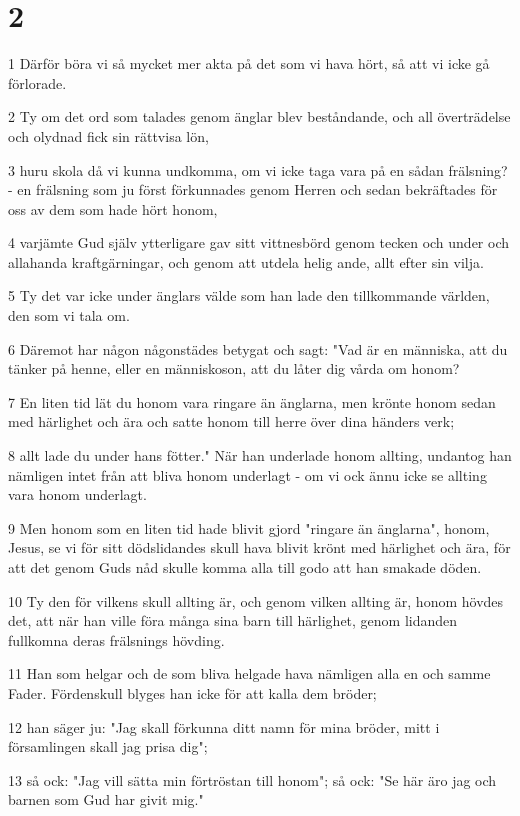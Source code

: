 \chapter{2}

\par 1 Därför böra vi så mycket mer akta på det som vi hava hört, så att vi icke gå förlorade.
\par 2 Ty om det ord som talades genom änglar blev beståndande, och all överträdelse och olydnad fick sin rättvisa lön,
\par 3 huru skola då vi kunna undkomma, om vi icke taga vara på en sådan frälsning? - en frälsning som ju först förkunnades genom Herren och sedan bekräftades för oss av dem som hade hört honom,
\par 4 varjämte Gud själv ytterligare gav sitt vittnesbörd genom tecken och under och allahanda kraftgärningar, och genom att utdela helig ande, allt efter sin vilja.
\par 5 Ty det var icke under änglars välde som han lade den tillkommande världen, den som vi tala om.
\par 6 Däremot har någon någonstädes betygat och sagt: "Vad är en människa, att du tänker på henne, eller en människoson, att du låter dig vårda om honom?
\par 7 En liten tid lät du honom vara ringare än änglarna, men krönte honom sedan med härlighet och ära och satte honom till herre över dina händers verk;
\par 8 allt lade du under hans fötter." När han underlade honom allting, undantog han nämligen intet från att bliva honom underlagt - om vi ock ännu icke se allting vara honom underlagt.
\par 9 Men honom som en liten tid hade blivit gjord "ringare än änglarna", honom, Jesus, se vi för sitt dödslidandes skull hava blivit krönt med härlighet och ära, för att det genom Guds nåd skulle komma alla till godo att han smakade döden.
\par 10 Ty den för vilkens skull allting är, och genom vilken allting är, honom hövdes det, att när han ville föra många sina barn till härlighet, genom lidanden fullkomna deras frälsnings hövding.
\par 11 Han som helgar och de som bliva helgade hava nämligen alla en och samme Fader. Fördenskull blyges han icke för att kalla dem bröder;
\par 12 han säger ju: "Jag skall förkunna ditt namn för mina bröder, mitt i församlingen skall jag prisa dig";
\par 13 så ock: "Jag vill sätta min förtröstan till honom"; så ock: "Se här äro jag och barnen som Gud har givit mig."
